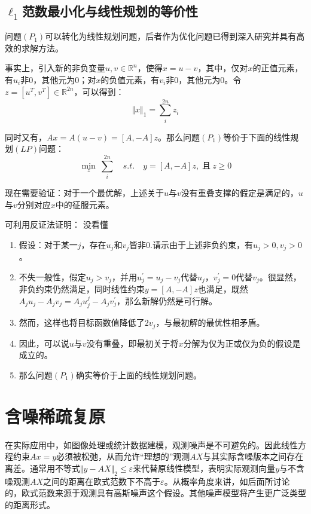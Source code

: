 \subsection{$\ell_1$范数最小化与线性规划的等价性}
{\heiti 问题$ (P_1) $可以转化为线性规划问题，后者作为优化问题已得到深入研究并具有高效的求解方法。}

事实上，引入新的非负变量$ u,v\in \mathbb{R}^n $，使得$ x =u-v $，其中，仅对$ x $的正值元素，有$ u_i $非0，其他元为0；对$ x $的负值元素，有$ v_i $非0，其他元为0。令$ z=[u^T,v^T]\in\mathbb{R}^{2n} $，可以得到：
\begin{equation*}\label{key}
\Vert x\Vert_1 = \sum_{i}^{2n}z_i
\end{equation*}

同时又有，$ Ax=A(u-v)=[A,-A]z $。那么问题$ (P_1) $等价于下面的线性规划$ (LP) $问题：
\begin{equation}\label{key}
\min_{z} \:\sum_{i}^{2n}\quad  s.t.\quad  y=[A,-A]z,\;\mbox{且}\:z\geq 0
\end{equation}

现在需要验证：{\heiti 对于一个最优解，上述关于$ u $与$ v $没有重叠支撑的假定是满足的，$ u $与$ v $分别对应$ x $中的征服元素。}

可利用反证法证明：{ 没看懂}
\begin{enumerate}
	\item 假设：对于某一$ j $，存在$ u_j $和$ v_j$皆非0.请示由于上述非负约束，有$ u_j>0,v_j>0 $。
	\item 不失一般性，假定$ u_j>v_j $，并用$ u^{'}_{j}=u_j-v_j $代替$ u_j $，$ v_j^{'}=0 $代替$ v_j $。很显然，非负约束仍然满足，同时线性约束$ y=[A,-A]z $也满足，既然$ A_j u_j -A_j v_j = A_j u^{j}_j - A_j v_j^{'} $，那么新解仍然是可行解。
	\item 然而，这样也将目标函数值降低了$ 2v_j $，与最初解的最优性相矛盾。
	\item 因此，可以说$ u $与$ v $没有重叠，即最初关于将$ x $分解为仅为正或仅为负的假设是成立的。
	\item {\heiti 那么问题$(P_1)$确实等价于上面的线性规划问题。}
\end{enumerate}




\section{含噪稀疏复原}
在实际应用中，如图像处理或统计数据建模，观测噪声是不可避免的。因此线性方程约束$Ax=y $必须被松弛，从而允许“理想的”观测$ AX $与其实际含噪版本之间存在离差。{\heiti 通常用不等式$ \Vert y-AX\Vert_2\leq \varepsilon $来代替原线性模型}，表明实际观测向量$ y $与不含噪观测$ AX $之间的距离在欧式范数下不高于$ \varepsilon $。从概率角度来讲，如后面所讨论的，欧式范数来源于观测具有高斯噪声这个假设。其他噪声模型将产生更广泛类型的距离形式。
	

